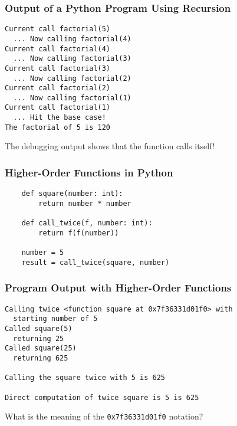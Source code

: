 \documentclass[14pt,aspectratio=169]{beamer}
\begin{document}
%
\begin{frame}[fragile]
  \frametitle{Output of a Python Program Using Recursion}
  \normalsize
  \begin{minipage}{6in}
    \vspace*{.25in}
    \begin{verbatim}
Current call factorial(5)
  ... Now calling factorial(4)
Current call factorial(4)
  ... Now calling factorial(3)
Current call factorial(3)
  ... Now calling factorial(2)
Current call factorial(2)
  ... Now calling factorial(1)
Current call factorial(1)
  ... Hit the base case!
The factorial of 5 is 120
    \end{verbatim}
  \end{minipage}
  \vspace*{.05in}
  \begin{center}
    \normalsize \noindent The debugging output shows that the function calls
    itself!\\
  \end{center}
\end{frame}

%
\begin{frame}[fragile]
  \frametitle{Higher-Order Functions in Python}
  \hspace*{-.6in}
  \begin{minipage}{6in}
    \begin{verbatim}
    def square(number: int):
        return number * number

    def call_twice(f, number: int):
        return f(f(number))

    number = 5
    result = call_twice(square, number)
    \end{verbatim}
  \end{minipage}
  \vspace*{.05in}
\end{frame}

%
\begin{frame}[fragile]
  \frametitle{Program Output with Higher-Order Functions}
  \normalsize
  \begin{minipage}{6in}
    \vspace*{.25in}
    \begin{verbatim}
Calling twice <function square at 0x7f36331d01f0> with
  starting number of 5
Called square(5)
  returning 25
Called square(25)
  returning 625

Calling the square twice with 5 is 625

Direct computation of twice square is 5 is 625
    \end{verbatim}
  \end{minipage}
  \vspace*{.05in}
  \begin{center}
    \normalsize \noindent What is the meaning of the {\tt 0x7f36331d01f0}
    notation?\\
  \end{center}
\end{frame}
\end{document}
